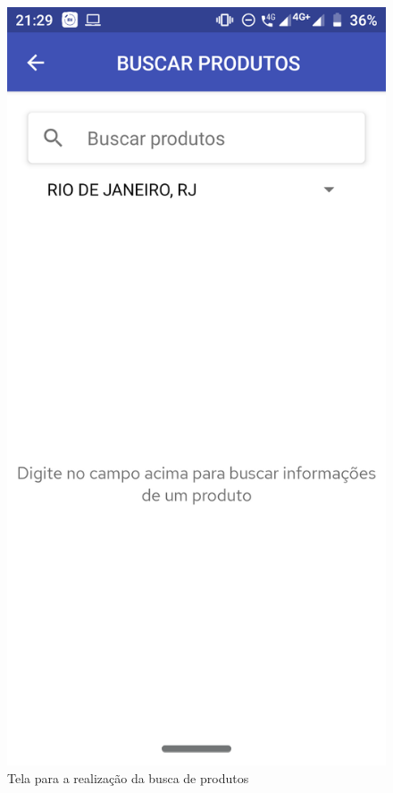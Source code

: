 \begin{figure}[h]
    \centering
    \includegraphics[scale=0.15]{tcc/figures/app/app_buscar_produtos.png}
    \caption{Tela para a realização da busca de produtos}
    \label{appBuscaProdutosInicialFig}
\end{figure}

